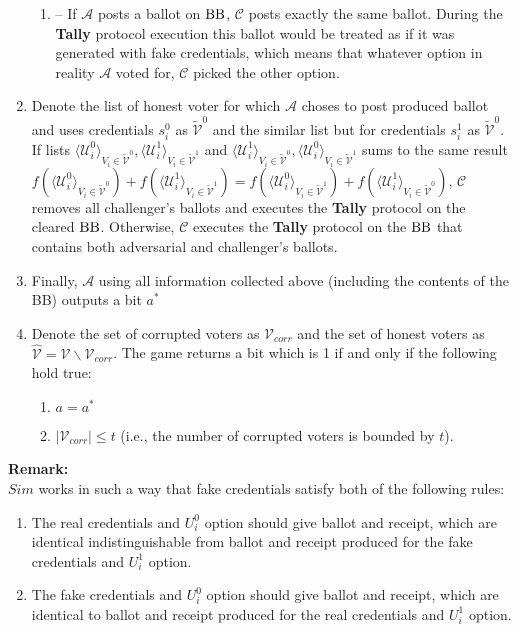\begin{enumerate}
\begin{enumerate}
\item[] --  If  $\mathcal{A}$ posts a ballot on $\operatorname{BB}$, $\mathcal{C}$ posts exactly the same ballot. During the \textbf{Tally} protocol execution this ballot would be treated as if it was generated with fake credentials, which means that whatever option in reality $\mathcal{A}$ voted for, $\mathcal{C}$ picked the other option.  
\end{enumerate}
\item Denote the list of honest voter for which $\mathcal{A}$ choses to post produced ballot and uses credentials $s_i^0$  as $ \tilde{\mathcal{V}}^0$ and the similar list but for credentials $s_i^1$ as $ \tilde{\mathcal{V}}^0$.  If  lists $\langle \mathcal{U}^0_i \rangle _{V_i \in \tilde{\mathcal{V}}^0}, \langle \mathcal{U}^1_i \rangle _{V_i \in \tilde{\mathcal{V}}^1}$ and $\langle \mathcal{U}^1_i \rangle _{V_i \in \tilde{\mathcal{V}}^0}, \langle \mathcal{U}^0_i \rangle _{V_i \in \tilde{\mathcal{V}}^1}$ sums to the same result $f(\langle \mathcal{U}^0_i \rangle _{V_i \in \tilde{\mathcal{V}}^0} ) + f(\langle \mathcal{U}^1_i \rangle _{V_i \in \tilde{\mathcal{V}}^1} ) =  f(\langle \mathcal{U}^0_i \rangle _{V_i \in \tilde{\mathcal{V}}^1} ) +  f(\langle \mathcal{U}^1_i \rangle _{V_i \in \tilde{\mathcal{V}}^0} )$, $\mathcal{C}$ removes all challenger's ballots and executes the \textbf{Tally} protocol on the cleared $\operatorname{BB}$. Otherwise, $\mathcal{C}$ executes the \textbf{Tally} protocol on the $\operatorname{BB}$ that contains both adversarial and challenger's ballots. 
\item Finally, $\mathcal{A}$ using all information collected above (including the contents of the BB) outputs a bit $a^*$
\item Denote the set of corrupted voters as $\mathcal{V}_{corr}$ and the set of honest voters as $\hat{\mathcal{V}}= \mathcal{V} \backslash \mathcal{V}_{corr}$. The game returns a bit which is 1 if and only if the following hold true:
\begin{enumerate}
 \item $a = a^*$
 \item $|\mathcal{V}_{corr}| \leq t$ (i.e., the number of corrupted voters is bounded by $t$).
\end{enumerate} 
\end{enumerate}

\textbf{Remark:}\\
$Sim$ works in such a way that fake credentials satisfy both of the following rules: 
\begin{enumerate}
 \item The real credentials and $U_i^0$ option  should give ballot and receipt, which are identical indistinguishable from ballot and receipt produced for the fake credentials and  $U_i^1$ option.
 \item The fake credentials and $U_i^0$ option  should give ballot and receipt, which are identical to ballot and receipt produced for the real credentials and  $U_i^1$ option.
 \end{enumerate}

